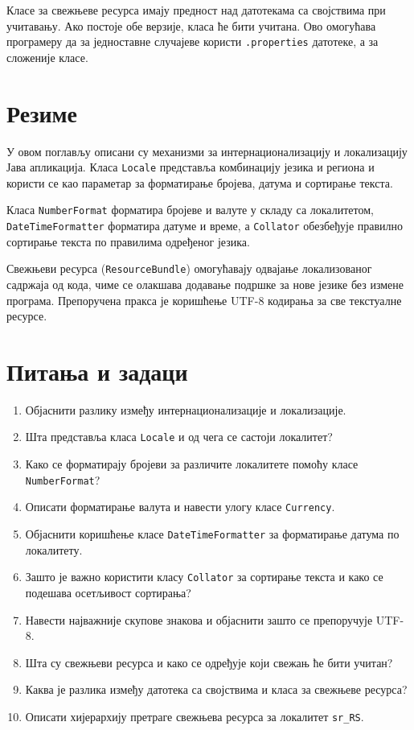 Класе за свежњеве ресурса имају предност над датотекама са својствима при учитавању. Ако постоје обе верзије, класа ће бити учитана. Ово омогућава програмеру да за једноставне случајеве користи \texttt{.properties} датотеке, а за сложеније класе.


\section{Резиме}

У овом поглављу описани су механизми за интернационализацију и локализацију Јава апликација. Класа \texttt{Locale} представља комбинацију језика и региона и користи се као параметар за форматирање бројева, датума и сортирање текста.

Класа \texttt{NumberFormat} форматира бројеве и валуте у складу са локалитетом, \texttt{DateTimeFormatter} форматира датуме и време, а \texttt{Collator} обезбеђује правилно сортирање текста по правилима одређеног језика.

Свежњеви ресурса (\texttt{ResourceBundle}) омогућавају одвајање локализованог садржаја од кода, чиме се олакшава додавање подршке за нове језике без измене програма. Препоручена пракса је коришћење UTF-8 кодирања за све текстуалне ресурсе.


\section{Питања и задаци}

\begin{enumerate}
\item Објаснити разлику између интернационализације и локализације.
\item Шта представља класа \texttt{Locale} и од чега се састоји локалитет?
\item Како се форматирају бројеви за различите локалитете помоћу класе \texttt{NumberFormat}?
\item Описати форматирање валута и навести улогу класе \texttt{Currency}.
\item Објаснити коришћење класе \texttt{DateTimeFormatter} за форматирање датума по локалитету.
\item Зашто је важно користити класу \texttt{Collator} за сортирање текста и како се подешава осетљивост сортирања?
\item Навести најважније скупове знакова и објаснити зашто се препоручује UTF-8.
\item Шта су свежњеви ресурса и како се одређује који свежањ ће бити учитан?
\item Каква је разлика између датотека са својствима и класа за свежњеве ресурса?
\item Описати хијерархију претраге свежњева ресурса за локалитет \texttt{sr\_RS}.
\end{enumerate}


